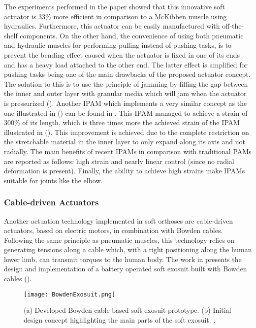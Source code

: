 The experiments performed in the paper showed that this innovative soft actuator is 33\% more efficient in comparison to a McKibben muscle using hydraulics. Furthermore, this actuator can be easily manufactured with off-the-shelf components. On the other hand, the convenience of using both pneumatic and hydraulic muscles for performing pulling instead of pushing tasks, is to prevent the bending effect caused when the actuator is fixed in one of its ends and has a heavy load attached to the other end. The latter effect is amplified for pushing tasks being one of the main drawbacks of the proposed actuator concept. The solution to this is to use the principle of jamming by filling the gap between the inner and outer layer with granular media which will jam when the actuator is pressurized (). Another IPAM which implements a very similar concept as the one illustrated in () can be found in \cite{Hawkes2016}. This IPAM managed to achieve a strain of 300\% of its length, which is three times more the achieved strain of the IPAM illustrated in (). This improvement is achieved due to the complete restriction on the stretchable material in the inner layer to only expand along its axis and not radially. The main benefits of recent IPAMs in comparison with traditional PAMs are reported as follows: high strain and nearly linear control (since no radial deformation is present). Finally, the ability to achieve high strains make IPAMs suitable for joints like the elbow.

\subsubsection{Cable-driven Actuators} \label{sec:cable-driven}

Another actuation technology implemented in soft orthoses are cable-driven actuators, based on electric motors, in combination with Bowden cables. Following the same principle as pneumatic muscles, this technology relies on generating tensions along a cable which, with a right positioning along the human lower limb, can transmit torques to the human body. The work in \cite{asbeck2013biologically} presents the design and implementation of a battery operated soft exosuit built with Bowden cables (). 
\begin{figure}[hbtp!]
    \centering
    \texttt{[image: BowdenExosuit.png]}
    \caption{(a) Developed Bowden cable-based soft exosuit prototype. (b) Initial design concept highlighting the main parts of the soft exosuit. \cite{asbeck2013biologically}. }
    \label{fig:bowden_exo}
\end{figure}

